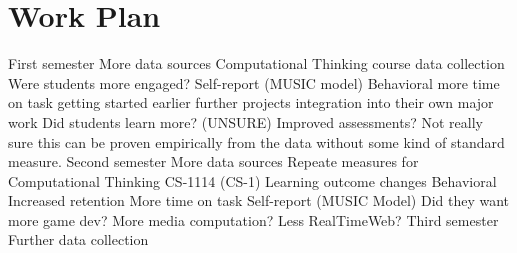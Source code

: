 \section{Work Plan}

First semester
More data sources
Computational Thinking course data collection
Were students more engaged?
Self-report (MUSIC model)
Behavioral
more time on task
getting started earlier
further projects
integration into their own major work
Did students learn more? (UNSURE)
Improved assessments?
Not really sure this can be proven empirically from the data without some kind of standard measure.
Second semester
More data sources
Repeate measures for Computational Thinking
CS-1114 (CS-1)
Learning outcome changes
Behavioral
Increased retention
More time on task
Self-report (MUSIC Model)
Did they want more game dev? More media computation? Less RealTimeWeb?
Third semester
Further data collection
